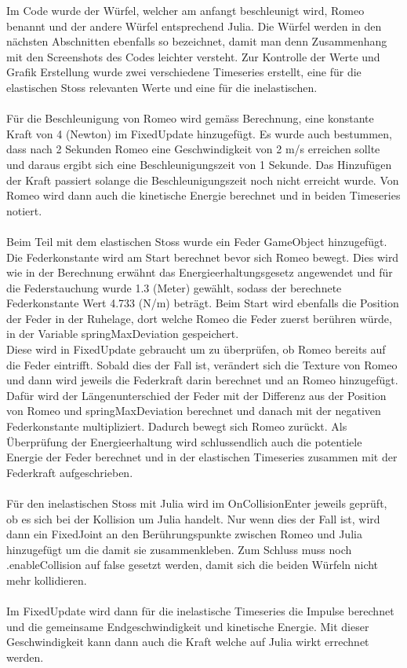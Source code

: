 \documentclass[../main.tex]{subfiles}
\begin{document}
Im Code wurde der Würfel, welcher am anfangt beschleunigt wird, Romeo benannt und der andere Würfel entsprechend Julia. Die Würfel werden in den nächsten Abschnitten ebenfalls so bezeichnet, damit man denn Zusammenhang mit den Screenshots des Codes leichter versteht. Zur Kontrolle der Werte und Grafik Erstellung wurde zwei verschiedene Timeseries erstellt, eine für die elastischen Stoss relevanten Werte und eine für die inelastischen.
\\
\\
Für die Beschleunigung von Romeo wird gemäss Berechnung, eine konstante Kraft von 4 (Newton) im FixedUpdate hinzugefügt. Es wurde auch bestummen, dass nach 2 Sekunden Romeo eine Geschwindigkeit von 2 m/s erreichen sollte und daraus ergibt sich eine Beschleunigungszeit von 1 Sekunde. Das Hinzufügen der Kraft passiert solange die Beschleunigungszeit noch nicht erreicht wurde. Von Romeo wird dann auch die kinetische Energie berechnet und in beiden Timeseries notiert.
\\
\\
Beim Teil mit dem elastischen Stoss wurde ein Feder GameObject hinzugefügt. Die Federkonstante wird am Start berechnet bevor sich Romeo bewegt. Dies wird wie in der Berechnung erwähnt das Energieerhaltungsgesetz angewendet und für die Federstauchung wurde 1.3 (Meter) gewählt, sodass der berechnete Federkonstante Wert 4.733 (N/m) beträgt. Beim Start wird ebenfalls die Position der Feder in der Ruhelage, dort welche Romeo die Feder zuerst berühren würde, in der Variable springMaxDeviation gespeichert. \\ 
Diese wird in FixedUpdate gebraucht um zu überprüfen, ob Romeo bereits auf die Feder eintrifft. 
Sobald dies der Fall ist, verändert sich die Texture von Romeo und dann wird jeweils die Federkraft darin berechnet und an Romeo hinzugefügt. Dafür wird der Längenunterschied der Feder mit der Differenz aus der Position von Romeo und springMaxDeviation berechnet und danach mit der negativen Federkonstante multipliziert. Dadurch bewegt sich Romeo  zurückt. Als Überprüfung der Energieerhaltung wird schlussendlich auch die potentiele Energie der Feder berechnet und in der elastischen Timeseries zusammen mit der Federkraft aufgeschrieben. 
\\
\\
Für den inelastischen Stoss mit Julia wird im OnCollisionEnter jeweils geprüft, ob es sich bei der Kollision um Julia handelt. Nur wenn dies der Fall ist, wird dann ein FixedJoint an den Berührungspunkte zwischen Romeo und Julia hinzugefügt um die damit sie zusammenkleben. Zum Schluss muss noch .enableCollision auf false gesetzt werden, damit sich die beiden Würfeln nicht mehr kollidieren. 
\\ \\ Im FixedUpdate wird dann für die inelastische Timeseries die Impulse berechnet und die gemeinsame Endgeschwindigkeit und kinetische Energie. Mit dieser Geschwindigkeit kann dann auch die Kraft welche auf Julia wirkt errechnet werden.
\end{document}

